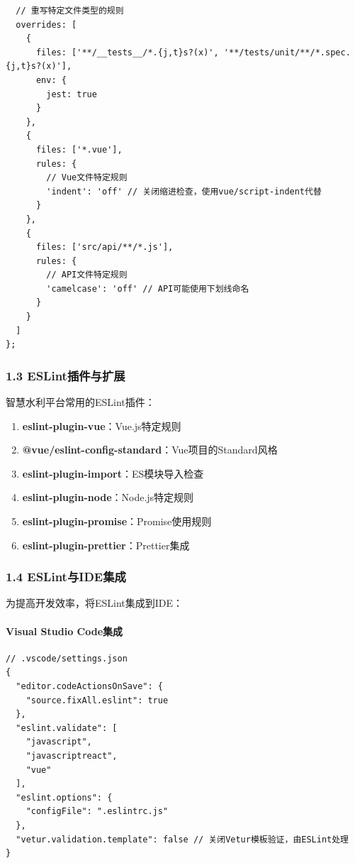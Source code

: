 \begin{lstlisting}
  // 重写特定文件类型的规则
  overrides: [
    {
      files: ['**/__tests__/*.{j,t}s?(x)', '**/tests/unit/**/*.spec.{j,t}s?(x)'],
      env: {
        jest: true
      }
    },
    {
      files: ['*.vue'],
      rules: {
        // Vue文件特定规则
        'indent': 'off' // 关闭缩进检查，使用vue/script-indent代替
      }
    },
    {
      files: ['src/api/**/*.js'],
      rules: {
        // API文件特定规则
        'camelcase': 'off' // API可能使用下划线命名
      }
    }
  ]
};
\end{lstlisting}

\subsubsection{1.3
ESLint插件与扩展}\label{eslintux63d2ux4ef6ux4e0eux6269ux5c55}

智慧水利平台常用的ESLint插件：

\begin{enumerate}
\def\labelenumi{\arabic{enumi}.}
\tightlist
\item
  \textbf{eslint-plugin-vue}：Vue.js特定规则
\item
  \textbf{@vue/eslint-config-standard}：Vue项目的Standard风格
\item
  \textbf{eslint-plugin-import}：ES模块导入检查
\item
  \textbf{eslint-plugin-node}：Node.js特定规则
\item
  \textbf{eslint-plugin-promise}：Promise使用规则
\item
  \textbf{eslint-plugin-prettier}：Prettier集成
\end{enumerate}

\subsubsection{1.4 ESLint与IDE集成}\label{eslintux4e0eideux96c6ux6210}

为提高开发效率，将ESLint集成到IDE：

\paragraph{Visual Studio Code集成}\label{visual-studio-codeux96c6ux6210}

\begin{lstlisting}
// .vscode/settings.json
{
  "editor.codeActionsOnSave": {
    "source.fixAll.eslint": true
  },
  "eslint.validate": [
    "javascript",
    "javascriptreact",
    "vue"
  ],
  "eslint.options": {
    "configFile": ".eslintrc.js"
  },
  "vetur.validation.template": false // 关闭Vetur模板验证，由ESLint处理
}
\end{lstlisting}

